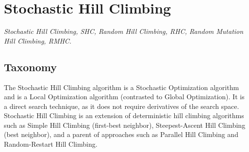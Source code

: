 

\section{Stochastic Hill Climbing} 
\label{sec:hill_climbing_search}

\emph{Stochastic Hill Climbing, SHC, Random Hill Climbing, RHC, Random Mutation Hill Climbing, RMHC.}

\subsection{Taxonomy}
The Stochastic Hill Climbing algorithm is a Stochastic Optimization algorithm and is a Local Optimization algorithm (contrasted to Global Optimization). It is a direct search technique, as it does not require derivatives of the search space.
Stochastic Hill Climbing is an extension of deterministic hill climbing algorithms such as Simple Hill Climbing (first-best neighbor), Steepest-Ascent Hill Climbing (best neighbor), and a parent of approaches such as Parallel Hill Climbing and Random-Restart Hill Climbing.


